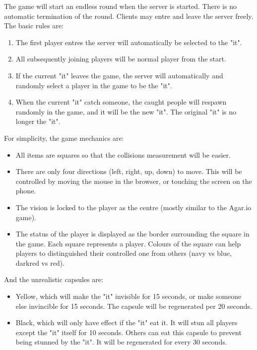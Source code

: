 \documentclass[12pt]{article}
\begin{document}
The game will start an endless round when the server is started. There is no automatic termination of the round. Clients may entre and leave the server freely. The basic rules are:

\begin{enumerate}
  \item The first player entres the server will automatically be selected to the "it".
  \item All subsequently joining players will be normal player from the start.
  \item If the current "it" leaves the game, the server will automatically and randomly select a player in the game to be the "it".
  \item When the current "it" catch someone, the caught people will respawn randomly in the game, and it will be the new "it". The original "it" is no longer the "it".
\end{enumerate}

For simplicity, the game mechanics are:

\begin{itemize}
  \item All items are squares so that the collisions measurement will be easier.
  \item There are only four directions (left, right, up, down) to move. This will be controlled by moving the mouse in the browser, or touching the screen on the phone.
  \item The vision is locked to the player as the centre (mostly similar to the Agar.io game).
  \item The status of the player is displayed as the border surrounding the square in the game. Each square represents a player. Colours of the square can help players to distinguished their controlled one from others (navy vs blue, darkred vs red).
\end{itemize}

And the unrealistic capsules are:

\begin{itemize}
  \item Yellow, which will make the "it" invisible for 15 seconds, or make someone else invincible for 15 seconds. The capsule will be regenerated per 20 seconds.
  \item Black, which will only have effect if the "it" eat it. It will stun all players except the "it" itself for 10 seconds. Others can eat this capsule to prevent being stunned by the "it". It will be regenerated for every 30 seconds.
\end{itemize}
\end{document}
